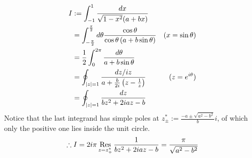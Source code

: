 \item

\begin{align*}
	I
	 & := \int_{-1}^1 \frac{dx}{\sqrt{1 - x^2} (a + bx)}                                                                  \\
	 & = \int_{-\frac{\pi}{2}}^{\frac{\pi}{2}} d\theta \frac{\cos\theta}{\cos\theta \left( a + b\sin\theta \right)} & (x = \sin \theta) \\
	 & = \frac{1}{2} \int_0^{2\pi} \frac{d\theta}{a + b\sin\theta}                                                              \\
	 & = \oint_{\left| z \right| = 1} \frac{dz/iz}{a + \frac{b}{2i}\left( z - \frac{1}{z} \right)}             & (z = e^{i\theta}) \\
	 & = \oint_{\left| z \right| = 1} \frac{dz}{bz^2 + 2iaz - b}
\end{align*}
Notice that the last integrand has simple poles at $z_{\pm}^* := \frac{-a \pm \sqrt{a^2 - b^2}}{b}i$,
of which only the positive one lies inside the unit circle.
\[
	\therefore I
	= 2i\pi \mathop{\mathrm{Res}}_{z = z_+^*} \frac{1}{bz^2 + 2iaz - b}
	= \frac{\pi}{\sqrt{a^2 - b^2}}
\]